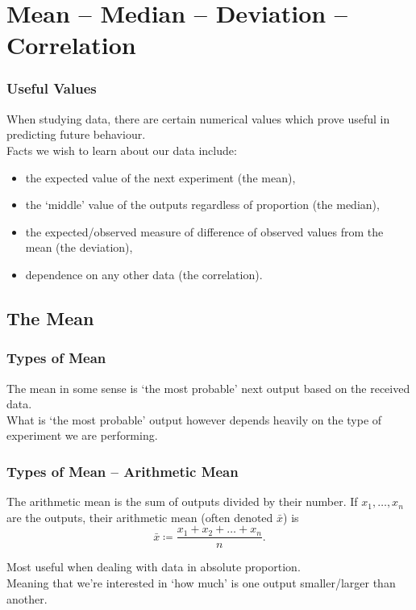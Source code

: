 \documentclass[aspectratio=169,11pt,svgnames,handout]{beamer}
\begin{document}
\section{Mean -- Median -- Deviation -- Correlation}

\begin{frame}
 \frametitle{Useful Values}
 When studying data, there are \alert{certain numerical values} which prove
 useful in predicting future behaviour.\\
 \pause
 Facts we wish to learn about our data include:
 \pause
 \begin{itemize}[label=\textbullet]
  \item the expected value of the next experiment (the \alert{mean}),
  \pause
  \item the `middle' value of the outputs regardless of proportion (the
   \alert{median}),
  \pause
  \item the expected/observed measure of difference of observed values from the
   mean (the \alert{deviation}),
  \pause
  \item dependence on any other data (the \alert{correlation}).
 \end{itemize}
\end{frame}

\subsection{The Mean}

\begin{frame}
 \subsectionpage
\end{frame}

\begin{frame}
 \frametitle{Types of Mean}
 The \alert{mean} in some sense is `the most probable' next output based on the
 received data.\\
 \pause
 What is `the most probable' output however depends heavily on the type of
 experiment we are performing.\\
\end{frame}

\begin{frame}
 \frametitle{Types of Mean -- Arithmetic Mean}
 \begin{tcolorbox}[title=Arithmetic Mean]
  The \alert{arithmetic mean} is the sum of outputs divided by their number. If
  $x_1,\ldots,x_n$ are the outputs, their arithmetic mean (often denoted
  $\bar{x}$) is
  \[
   \bar{x} \coloneqq \frac{x_1+x_2+\ldots +x_n}{n}.
  \]
 \end{tcolorbox}
 \pause
 Most useful when dealing with data in \alert{absolute} proportion.\\
 \pause
 Meaning that we're interested in `\alert{how much}' is one output
 smaller/larger than another.
\end{frame}
\end{document}
